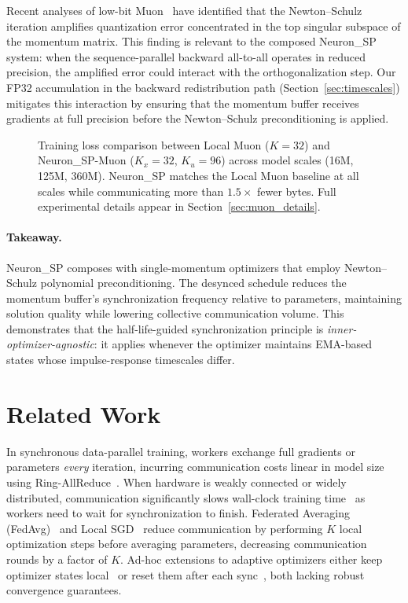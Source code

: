\documentclass{article}
\begin{document}
Recent analyses of low-bit Muon~\citep{muonlowbit2026iclr} have
identified that the Newton--Schulz iteration amplifies quantization
error concentrated in the top singular subspace of the momentum matrix.
This finding is relevant to the composed Neuron\_SP system: when the
sequence-parallel backward all-to-all operates in reduced precision, the
amplified error could interact with the orthogonalization step.
Our FP32 accumulation in the backward redistribution path
(Section~\ref{sec:timescales}) mitigates this interaction by ensuring
that the momentum buffer receives gradients at full precision before
the Newton--Schulz preconditioning is applied.

\begin{figure}[t]
\centering
\caption{Training loss comparison between Local Muon ($K = 32$) and
Neuron\_SP-Muon ($K_x = 32$, $K_u = 96$) across model scales
(16M, 125M, 360M). Neuron\_SP matches the Local Muon baseline at all
scales while communicating more than $\mathbf{1.5\times}$ fewer bytes.
Full experimental details appear in Section~\ref{sec:muon_details}.}
\label{fig:muon}
\end{figure}

\paragraph{Takeaway.}
Neuron\_SP composes with single-momentum optimizers that employ
Newton--Schulz polynomial preconditioning. The desynced schedule reduces
the momentum buffer's synchronization frequency relative to parameters,
maintaining solution quality while lowering collective communication
volume. This demonstrates that the half-life-guided synchronization
principle is \emph{inner-optimizer-agnostic}: it applies whenever the
optimizer maintains EMA-based states whose impulse-response timescales
differ.



\section{Related Work}
\label{sec:related}

In synchronous data-parallel training, workers exchange full gradients or parameters \textit{every} iteration,
incurring communication costs linear in model size using Ring-AllReduce~\citep{sergeev2018horovod}.
When hardware is weakly connected or widely distributed, communication significantly
slows wall-clock training time~\citep{sani2025photon} as workers need to wait for synchronization to
finish. Federated Averaging (FedAvg)~\citep{mcmahan2017communication} and Local SGD~\citep{stich2019local}
reduce communication by performing $K$ local optimization steps before averaging parameters,
decreasing communication rounds by a factor of $K$. Ad-hoc extensions to adaptive optimizers either
keep optimizer states local~\citep{douillard2023diloco,charles2025scaling,liu2024asynchronous} or reset them
after each sync~\citep{sani2024future,sani2025photon}, both lacking robust convergence guarantees.
\end{document}
